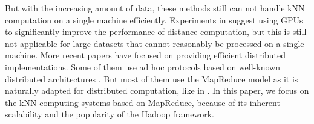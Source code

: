 But with the increasing amount of data, these methods still can not handle kNN computation 
on a single machine efficiently. Experiments in \cite{10.1371/journal.pone.0044000} suggest using GPUs to significantly improve the 
performance of distance computation, but this is still not applicable for large datasets that cannot reasonably be 
processed on a single machine. 
More recent papers have focused on providing efficient distributed implementations. Some of 
them use ad hoc protocols based on well-known distributed architectures \cite{Novak:2006:MSD:1146847.1146866,Haghani_lshat}. But most of them 
use the MapReduce model as it is naturally adapted for distributed computation, like in \cite{Stupar10rankreduce-,Lu:2012:EPK:2336664.2336674,Zhang:2012:EPK:2247596.2247602}. In this paper, we focus on the kNN computing systems based on MapReduce, because of its 
inherent scalability and the popularity of the Hadoop framework.

%


